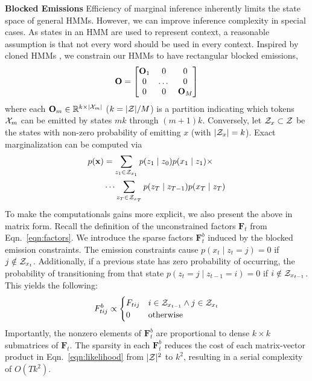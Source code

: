 \documentclass[11pt,a4paper]{article}
\begin{document}
\noindent
\textbf{Blocked Emissions} Efficiency of marginal inference inherently limits 
the state space of general HMMs.
However, we can improve inference complexity in special cases.
As states in an HMM are used to represent context, a reasonable assumption
is that not every word should be used in every context.
Inspired by cloned HMMs \citep{dedieu2019learning},
we constrain our HMMs to have rectangular blocked emissions,
\[\mathbf{O} = \begin{bmatrix} \mathbf{O}_1 & 0 & 0 \\ 0 & $\dots$ & 0 \\ 0 & 0 & \mathbf{O}_M \\
\end{bmatrix}\]
where each $\mathbf{O}_m \in \mathbb{R}^{ k \times |\mathcal{X}_m|}$ ($k = |{\mathcal{Z}}|/M$)
is a partition indicating which tokens $\mathcal{X}_m$ can be emitted by states
$mk$ through $(m+1)k$.
Conversely, let $\mathcal{Z}_x \subset {\cal Z}$ be the states with non-zero probability of emitting $x$
(with $|\mathcal{Z}_x| = k$).
Exact marginalization can be computed via 
\begin{equation}
\label{eqn:sparse_marginalization}
\begin{aligned}
p(\mathbf{x}) &= \sum_{z_1 \in \mathcal{Z}_{x_1}} p(z_1\mid z_0)p(x_1 \mid z_1) \times\\
    &\cdots
    \sum_{z_T \in \mathcal{Z}_{x_T}} p(z_T \mid z_{T-1})p(x_T \mid z_T)
\end{aligned}
\end{equation}
To make the computationals gains more explicit, we also present the above in matrix form.
Recall the definition of the unconstrained factors
$\mathbf{F}_t$ from Eqn.~\ref{eqn:factors}.
We introduce the sparse factors $\mathbf{F}_t^b$ induced by the blocked emission constraints.
The emission constraints cause $p(x_t \mid z_t=j) = 0$ if $j\notin\mathcal{Z}_{x_t}$.
Additionally, if a previous state has zero probability of occurring, the probability
of transitioning from that state $p(z_t = j \mid z_{t-1} = i) = 0$ if $i\notin\mathcal{Z}_{x_{t-1}}$.
This yields the following:
\begin{equation}
\label{eqn:sparse_factors}
F_{tij}^b \propto \begin{cases}
F_{tij} & i\in\mathcal{Z}_{x_{t-1}} \wedge j\in\mathcal{Z}_{x_t}\\
0 & \textrm{otherwise}
\end{cases}
\end{equation}
Importantly, the nonzero elements of $\mathbf{F}_t^b$ are proportional to
dense $k \times k$ submatrices of $\mathbf{F}_t$.
The sparsity in each $\mathbf{F}_t^b$
reduces the cost of each matrix-vector product in Eqn.~\ref{eqn:likelihood}
from $|\mathcal{Z}|^2$ to $k^2$,
resulting in a serial complexity of $O(Tk^2)$.
\end{document}
